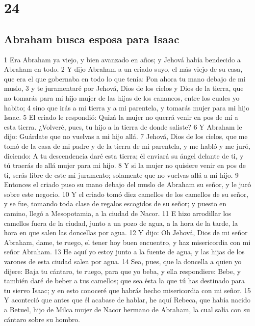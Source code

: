 \chapter{24}

\section{Abraham busca esposa para Isaac}

1 Era Abraham ya viejo, y bien avanzado en años; y Jehová había bendecido a Abraham en todo.
2 Y dijo Abraham a un criado suyo, el más viejo de su casa, que era el que gobernaba en todo lo que tenía: Pon ahora tu mano debajo de mi muslo,
3 y te juramentaré por Jehová, Dios de los cielos y Dios de la tierra, que no tomarás para mi hijo mujer de las hijas de los cananeos, entre los cuales yo habito;
4 sino que irás a mi tierra y a mi parentela, y tomarás mujer para mi hijo Isaac.
5 El criado le respondió: Quizá la mujer no querrá venir en pos de mí a esta tierra. ¿Volveré, pues, tu hijo a la tierra de donde saliste?
6 Y Abraham le dijo: Guárdate que no vuelvas a mi hijo allá.
7 Jehová, Dios de los cielos, que me tomó de la casa de mi padre y de la tierra de mi parentela, y me habló y me juró, diciendo: A tu descendencia daré esta tierra; él enviará su ángel delante de ti, y tú traerás de allá mujer para mi hijo.
8 Y si la mujer no quisiere venir en pos de ti, serás libre de este mi juramento; solamente que no vuelvas allá a mi hijo.
9 Entonces el criado puso su mano debajo del muslo de Abraham su señor, y le juró sobre este negocio.
10 Y el criado tomó diez camellos de los camellos de su señor, y se fue, tomando toda clase de regalos escogidos de su señor; y puesto en camino, llegó a Mesopotamia, a la ciudad de Nacor.
11 E hizo arrodillar los camellos fuera de la ciudad, junto a un pozo de agua, a la hora de la tarde, la hora en que salen las doncellas por agua.
12 Y dijo: Oh Jehová, Dios de mi señor Abraham, dame, te ruego, el tener hoy buen encuentro, y haz misericordia con mi señor Abraham.
13 He aquí yo estoy junto a la fuente de agua, y las hijas de los varones de esta ciudad salen por agua.
14 Sea, pues, que la doncella a quien yo dijere: Baja tu cántaro, te ruego, para que yo beba, y ella respondiere: Bebe, y también daré de beber a tus camellos; que sea ésta la que tú has destinado para tu siervo Isaac; y en esto conoceré que habrás hecho misericordia con mi señor.
15 Y aconteció que antes que él acabase de hablar, he aquí Rebeca, que había nacido a Betuel, hijo de Milca mujer de Nacor hermano de Abraham, la cual salía con su cántaro sobre su hombro.
